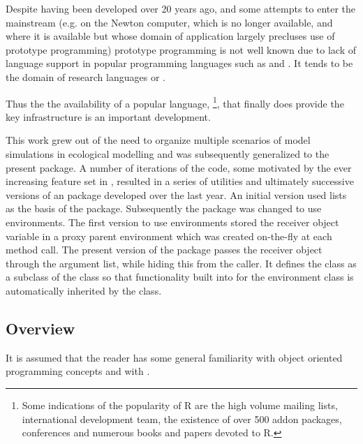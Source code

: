 \documentclass{Z}
\begin{document}
Despite having been developed over 20 years ago, and some attempts to
enter the mainstream (e.g.   
on the Newton computer, which
is no longer available, and  where 
it is available but whose
domain of application largely precluses use of prototype programming)
prototype programming is not well known due to lack of language
support in popular programming languages such as  and 
.  It tends
to be the domain of research languages or .

Thus the
the availability of a popular language,
 \footnote{Some indications of the popularity of R are
the high volume mailing lists, international development team, the
existence of over 500 addon packages, conferences and numerous books 
and papers devoted to R.},
that finally does provide the key infrastructure 
is an important development.

This work grew out of the need to organize multiple scenarios of model
simulations in ecological modelling \citep{Rnews:Petzoldt:2003} and
was subsequently generalized to the present package.  A number of
iterations of the code, some motivated by the ever increasing feature
set in , resulted in a series of utilities and ultimately
successive versions of an  package developed over the last
year.  An initial version used  lists as the basis of the
package.  Subsequently the package was changed to use 
environments.  The first version to use environments stored the
receiver object variable in a proxy parent environment which was
created on-the-fly at each method call.  The present version of
the  package passes the receiver object through the argument list,
while hiding this from the caller.  It defines the  class
as a subclass of the  class so that
functionality built into  for the environment class is
automatically inherited by the  class.

\subsection{Overview}

It is assumed that the reader has some general
familiarity with object oriented programming concepts and with
.
\end{document}
